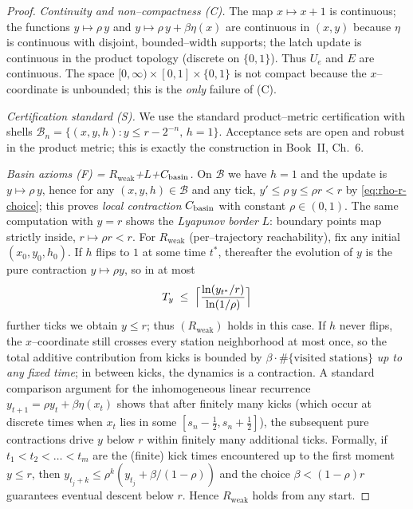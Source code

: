 \documentclass[12pt]{article}
\theoremstyle{definition}
\theoremstyle{plain}
\begin{document}
\begin{proof}
\emph{Continuity and non–compactness (C).}
The map \(x\mapsto x+1\) is continuous; the functions
\(y\mapsto \rho\,y\) and \(y\mapsto \rho\,y+\beta\eta(x)\) are continuous in
\((x,y)\) because \(\eta\) is continuous with disjoint, bounded–width supports;
the latch update is continuous in the product topology (discrete on \(\{0,1\}\)).
Thus \(U_e\) and \(E\) are continuous.  The space \([0,\infty)\times[0,1]\times\{0,1\}\)
is not compact because the \(x\)–coordinate is unbounded; this is the \emph{only}
failure of (C).

\smallskip
\emph{Certification standard (S).}
We use the standard product–metric certification with shells
\(\mathcal B_n=\{(x,y,h): y\le r-2^{-n},\,h=1\}\).
Acceptance sets are open and robust in the product metric; this is exactly the
construction in Book~II, Ch.~6.

\smallskip
\emph{Basin axioms (F) = \(R_{\text{weak}}\)+\(L\)+\(C_{\rm basin}\).}
On \(\mathcal B\) we have \(h=1\) and the update is \(y\mapsto \rho\,y\), hence
for any \((x,y,h)\in\mathcal B\) and any tick,
\(y'\le \rho\,y\le \rho r<r\) by \eqref{eq:rho-r-choice}; this proves
\emph{local contraction} \(C_{\rm basin}\) with constant \(\rho\in(0,1)\).
The same computation with \(y=r\) shows the \emph{Lyapunov border} \(L\):
boundary points map strictly inside, \(r\mapsto \rho r<r\).
For \(R_{\text{weak}}\) (per–trajectory reachability), fix any initial
\((x_0,y_0,h_0)\).  If \(h\) flips to \(1\) at some time \(t^\ast\), thereafter
the evolution of \(y\) is the pure contraction \(y\mapsto \rho y\), so in at most
\[
  T_y \;\le\; \Bigl\lceil\frac{\ln(y_{t^\ast}/r)}{\ln(1/\rho)}\Bigr\rceil
\]
further ticks we obtain \(y\le r\); thus \((R_{\text{weak}})\) holds in this case.
If \(h\) never flips, the \(x\)–coordinate still crosses every station
neighborhood at most once, so the total additive contribution from kicks is
bounded by \(\beta \cdot \#\{\text{visited stations}\}\) \emph{up to any fixed
time}; in between kicks, the dynamics is a contraction.  A standard comparison
argument for the inhomogeneous linear recurrence \(y_{t+1}=\rho y_t+\beta\eta(x_t)\)
shows that after finitely many kicks (which occur at discrete times when
\(x_t\) lies in some \([s_n-\tfrac12,s_n+\tfrac12]\)), the subsequent pure
contractions drive \(y\) below \(r\) within finitely many additional ticks.
Formally, if \(t_1<t_2<\dots<t_m\) are the (finite) kick times encountered up to
the first moment \(y\le r\), then
\(
y_{t_{j}+k}\le \rho^k(y_{t_j}+\beta/(1-\rho))
\)
and the choice \(\beta<(1-\rho)r\) guarantees eventual descent below \(r\).
Hence \(R_{\text{weak}}\) holds from any start.


\end{proof}
\end{document}
